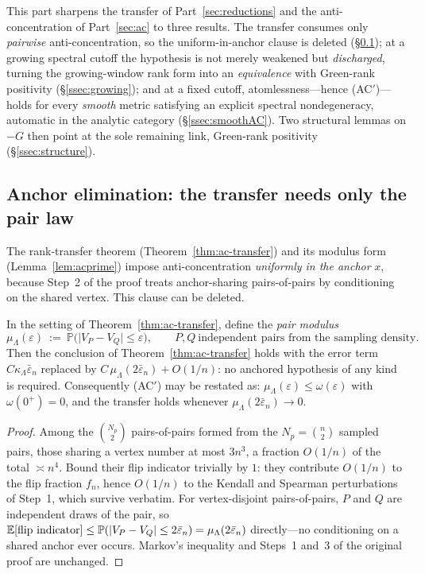 
This part sharpens the transfer of Part~\ref{sec:reductions} and the
anti-concentration of Part~\ref{sec:ac} to three results. The transfer consumes
only \emph{pairwise} anti-concentration, so the uniform-in-anchor clause is
deleted (\S\ref{ssec:anchor}); at a growing spectral cutoff the hypothesis is not
merely weakened but \emph{discharged}, turning the growing-window rank form into
an \emph{equivalence} with Green-rank positivity (\S\ref{ssec:growing}); and at a
fixed cutoff, atomlessness---hence (AC$'$)---holds for every \emph{smooth} metric
satisfying an explicit spectral nondegeneracy, automatic in the analytic category
(\S\ref{ssec:smoothAC}). Two structural lemmas on $-G$ then point at the sole
remaining link, Green-rank positivity (\S\ref{ssec:structure}).

\subsection{Anchor elimination: the transfer needs only the pair law}\label{ssec:anchor}

The rank-transfer theorem (Theorem~\ref{thm:ac-transfer}) and its modulus form
(Lemma~\ref{lem:acprime}) impose anti-concentration \emph{uniformly in the anchor}
$x$, because Step~2 of the proof treats anchor-sharing pairs-of-pairs by
conditioning on the shared vertex.  This clause can be deleted.

\begin{theorem}\label{thm:anchorfree}
In the setting of Theorem~\ref{thm:ac-transfer}, define the \emph{pair modulus}
\[
\mu_\Lambda(\varepsilon)\ :=\ \mathbb P\bigl(\lvert V_P-V_Q\rvert\le\varepsilon\bigr),
\qquad P,Q\ \text{independent pairs from the sampling density.}
\]
Then the conclusion of Theorem~\ref{thm:ac-transfer} holds with the error term
$C\kappa_\Lambda\bar\varepsilon_n$ replaced by $C\,\mu_\Lambda(2\bar\varepsilon_n)
+O(1/n)$: no anchored hypothesis of any kind is required.  Consequently
\textup{(AC$'$)} may be restated as: $\mu_\Lambda(\varepsilon)\le\omega(\varepsilon)$
with $\omega(0^+)=0$, and the transfer holds whenever
$\mu_\Lambda(2\bar\varepsilon_n)\to0$.
\end{theorem}

\begin{proof}
Among the $\binom{N_p}{2}$ pairs-of-pairs formed from the $N_p=\binom n2$ sampled
pairs, those sharing a vertex number at most $3n^3$, a fraction $O(1/n)$ of the
total $\asymp n^4$.  Bound their flip indicator trivially by $1$: they contribute
$O(1/n)$ to the flip fraction $f_n$, hence $O(1/n)$ to the Kendall and Spearman
perturbations of Step~1, which survive verbatim.  For vertex-disjoint
pairs-of-pairs, $P$ and $Q$ are independent draws of the pair, so
$\mathbb E[\text{flip indicator}]\le\mathbb P(\lvert V_P-V_Q\rvert\le2\bar\varepsilon_n)
=\mu_\Lambda(2\bar\varepsilon_n)$ directly---no conditioning on a shared anchor
ever occurs.  Markov's inequality and Steps~1 and~3 of the original proof are
unchanged.
\end{proof}


